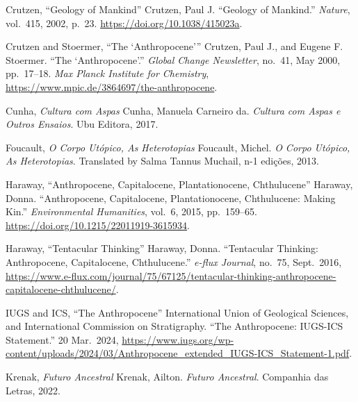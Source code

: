 
  {Crutzen, \enquote{Geology of Mankind}}
  {Crutzen, Paul J. \enquote{Geology of Mankind.} \emph{Nature},
   vol.~415, 2002, p.~23. \url{https://doi.org/10.1038/415023a}.}

  {Crutzen and Stoermer, \enquote{The \enquote{Anthropocene}}}
  {Crutzen, Paul J., and Eugene F. Stoermer. \enquote{The \enquote{Anthropocene}.}
   \emph{Global Change Newsletter}, no.~41, May 2000, pp.~17--18.
   \emph{Max Planck Institute for Chemistry},
   \url{https://www.mpic.de/3864697/the-anthropocene}.}

  {Cunha, \emph{Cultura com Aspas}}
  {Cunha, Manuela Carneiro da. \emph{Cultura com Aspas e Outros Ensaios}.
   Ubu Editora, 2017.}

  {Foucault, \emph{O Corpo Utópico, As Heterotopias}}
  {Foucault, Michel. \emph{O Corpo Utópico, As Heterotopias}.
   Translated by Salma Tannus Muchail, n-1 edições, 2013.}

  {Haraway, \enquote{Anthropocene, Capitalocene, Plantationocene, Chthulucene}}
  {Haraway, Donna. \enquote{Anthropocene, Capitalocene, Plantationocene,
   Chthulucene: Making Kin.} \emph{Environmental Humanities}, vol.~6,
   2015, pp.~159--65. \url{https://doi.org/10.1215/22011919-3615934}.}

  {Haraway, \enquote{Tentacular Thinking}}
  {Haraway, Donna. \enquote{Tentacular Thinking: Anthropocene,
   Capitalocene, Chthulucene.} \emph{e-flux Journal}, no.~75, Sept.~2016,
   \url{https://www.e-flux.com/journal/75/67125/tentacular-thinking-anthropocene-capitalocene-chthulucene/}.}

  {IUGS and ICS, \enquote{The Anthropocene}}
  {International Union of Geological Sciences, and International Commission
   on Stratigraphy. \enquote{The Anthropocene: IUGS-ICS Statement.}
   20 Mar.~2024,
   \url{https://www.iugs.org/wp-content/uploads/2024/03/Anthropocene_extended_IUGS-ICS_Statement-1.pdf}.}

  {Krenak, \emph{Futuro Ancestral}}
  {Krenak, Ailton. \emph{Futuro Ancestral}. Companhia das Letras, 2022.}

